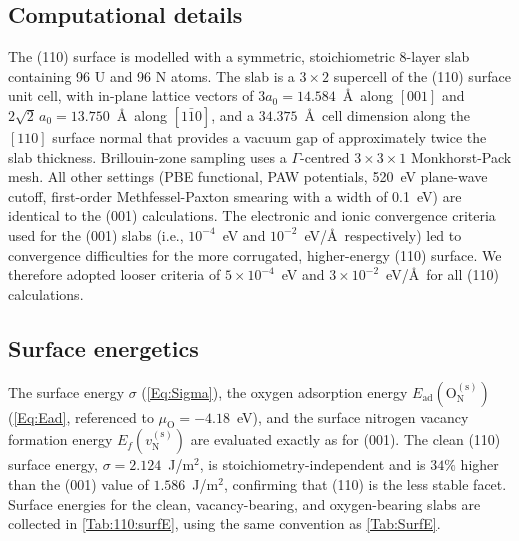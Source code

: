 \documentclass[preprint,12pt,sort&compress]{elsarticle}
\newcommand{\?}{\stackrel{?}{=}}
\begin{document}
\subsection{Computational details}
\label{App:110:comp}

The (110) surface is modelled with a symmetric, stoichiometric 8-layer slab containing 96 U and 96 N atoms. The slab is a $3\times2$ supercell of the (110) surface unit cell, with in-plane lattice vectors of $3a_0=14.584$~\AA\ along $[001]$ and $2\sqrt{2}\,a_0=13.750$~\AA\ along $[1\bar{1}0]$, and a $34.375$~\AA\ cell dimension along the $[110]$ surface normal that provides a vacuum gap of approximately twice the slab thickness. Brillouin-zone sampling uses a $\Gamma$-centred $3\times3\times1$ Monkhorst-Pack mesh. All other settings (PBE functional, PAW potentials, 520~eV plane-wave cutoff, first-order Methfessel-Paxton smearing with a width of 0.1~eV) are identical to the (001) calculations. The electronic and ionic convergence criteria used for the (001) slabs (i.e., $10^{-4}$~eV and $10^{-2}$~eV/\AA\ respectively) led to convergence difficulties for the more corrugated, higher-energy (110) surface. We therefore adopted looser criteria of $5\times10^{-4}$~eV and $3\times10^{-2}$~eV/\AA\ for all (110) calculations.

\subsection{Surface energetics}
\label{App:110:energetics}

The surface energy $\sigma$ (\cref{Eq:Sigma}), the oxygen adsorption energy $E_\text{ad}(\text{O}_\text{N}^{(\text{s})})$ (\cref{Eq:Ead}, referenced to $\mu_\text{O}=-4.18$~eV), and the surface nitrogen vacancy formation energy $E_f(v_\text{N}^{(\text{s})})$ are evaluated exactly as for (001). The clean (110) surface energy, $\sigma=2.124$~J/m$^2$, is stoichiometry-independent and is $34\%$ higher than the (001) value of $1.586$~J/m$^2$, confirming that (110) is the less stable facet. Surface energies for the clean, vacancy-bearing, and oxygen-bearing slabs are collected in \cref{Tab:110:surfE}, using the same convention as \cref{Tab:SurfE}.
\end{document}
